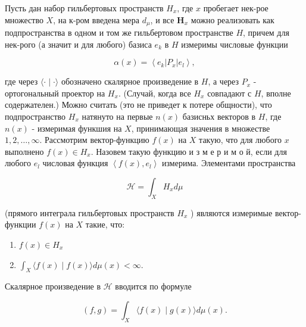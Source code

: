 \documentclass[10pt]{article}
\begin{document}
Пусть дан набор гильбертовых пространств $H_{x}$, где $x$ пробегает нек-рое множество $X$, на к-ром введена мера $d_{\mu}$, и все $\boldsymbol{H}_{x}$ можно реализовать как подпространства в одном и том же гильбертовом пространстве $H$, причем для нек-рого (а значит и для любого) базиса $e_{k}$ в $H$ измеримы числовые функции



\[

\alpha(x)=\left\langle e_{k}\left|P_{x}\right| e_{l}\right\rangle,

\]



где через $\langle\cdot \mid \cdot\rangle$ обозначено скалярное произведение в $H$, а через $P_{x}$ - ортогональный проектор на $H_{x}$. (Случай, когда все $H_{x}$ совпадают с $H$, вполне содержателен.) Можно считать (это не приведет к потере общности), что подпространство $H_{x}$ натянуто на первые $n(x)$ базисньх векторов в $H$, где $n(x)$ - измеримая функшия на $X$, принимающая значения в множестве $1,2, \ldots, \infty$. Рассмотрим вектор-функцию $f(x)$ на $X$ такую, что для любого $x$ выполнено $f(x) \in H_{x}$. Назовем такую функцию и з м е р и м о й, если для любого $e_{l}$ числовая функция $\left\langle f(x), e_{l}\right\rangle$ измерима. Элементами пространства



\[

\mathscr{H}=\int_{X} H_{x} d \mu

\]



(прямого интеграла гильбертовых пространств $H_{x}$ ) являются измеримые вектор-функции $f(x)$ на $X$ такие, что:



\begin{enumerate}

  \item $f(x) \in H_{x}$



  \item $\int_{X}\langle f(x) \mid f(x)\rangle d \mu(x)<\infty$.



\end{enumerate}



Скалярное произведение в $\mathscr{H}$ вводится по формуле



\[

(f, g)=\int_{X}\langle f(x) \mid g(x)\rangle d \mu(x) .

\]
\end{document}
